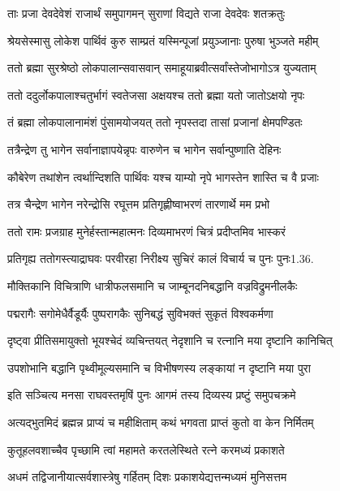 \twolineshloka
{ताः प्रजा देवदेवेशं राजार्थं समुपागमन्}
{सुराणां विद्यते राजा देवदेवः शतक्रतुः}%

\twolineshloka
{श्रेयसेस्मासु लोकेश पार्थिवं कुरु साम्प्रतं}
{यस्मिन्पूजां प्रयुञ्जानाः पुरुषा भुञ्जते महीम्}%

\twolineshloka
{ततो ब्रह्मा सुरश्रेष्ठो लोकपालान्सवासवान्}
{समाहूयाब्रवीत्सर्वांस्तेजोभागोऽत्र युज्यताम्}%

\twolineshloka
{ततो ददुर्लोकपालाश्चतुर्भागं स्वतेजसा}
{अक्षयश्च ततो ब्रह्मा यतो जातोऽक्षयो नृपः}%

\twolineshloka
{तं ब्रह्मा लोकपालानामंशं पुंसामयोजयत्}
{ततो नृपस्तदा तासां प्रजानां क्षेमपण्डितः}%

\twolineshloka
{तत्रैन्द्रेण तु भागेन सर्वानाज्ञापयेन्नृपः}
{वारुणेन च भागेन सर्वान्पुष्णाति देहिनः}%

\twolineshloka
{कौबेरेण तथांशेन त्वर्थान्दिशति पार्थिवः}
{यश्च याम्यो नृपे भागस्तेन शास्ति च वै प्रजाः}%

\twolineshloka
{तत्र चैन्द्रेण भागेन नरेन्द्रोसि रघूत्तम}
{प्रतिगृह्णीष्वाभरणं तारणार्थे मम प्रभो}%

\twolineshloka
{ततो रामः प्रजग्राह मुनेर्हस्तान्महात्मनः}
{दिव्यमाभरणं चित्रं प्रदीप्तमिव भास्करं}%

\twolineshloka
{प्रतिगृह्य ततोगस्त्याद्राघवः परवीरहा}
{निरीक्ष्य सुचिरं कालं विचार्य च पुनः पुनः1.36.}%

\twolineshloka
{मौक्तिकानि विचित्राणि धात्रीफलसमानि च}
{जाम्बूनदनिबद्धानि वज्रविद्रुमनीलकैः}%

\twolineshloka
{पद्मरागैः सगोमेधैर्वैडूर्यैः पुष्परागकैः}
{सुनिबद्धं सुविभक्तं सुकृतं विश्वकर्मणा}%

\twolineshloka
{दृष्ट्वा प्रीतिसमायुक्तो भूयश्चेदं व्यचिन्तयत्}
{नेदृशानि च रत्नानि मया दृष्टानि कानिचित्}%

\twolineshloka
{उपशोभानि बद्धानि पृथ्वीमूल्यसमानि च}
{विभीषणस्य लङ्कायां न दृष्टानि मया पुरा}%

\twolineshloka
{इति सञ्चित्य मनसा राघवस्तमृषिं पुनः}
{आगमं तस्य दिव्यस्य प्रष्टुं समुपचक्रमे}%

\twolineshloka
{अत्यद्भुतमिदं ब्रह्मन्न प्राप्यं च महीक्षिताम्}
{कथं भगवता प्राप्तं कुतो वा केन निर्मितम्}%

\twolineshloka
{कुतूहलवशाच्चैव पृच्छामि त्वां महामते}
{करतलेस्थिते रत्ने करमध्यं प्रकाशते}%

\twolineshloka
{अधमं तद्विजानीयात्सर्वशास्त्रेषु गर्हितम्}
{दिशः प्रकाशयेद्यत्तन्मध्यमं मुनिसत्तम}%

